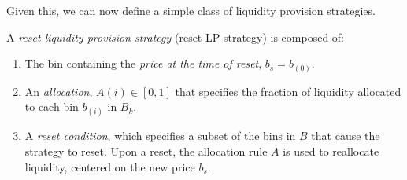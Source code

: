 \documentclass[sigconf, usenames, dvipsnames]{acmart}
\newcommand{\dcp}[1]{\textcolor{blue}{{\scriptsize{David:}}#1}}
\begin{document}



Given this, we can now define a simple class of liquidity provision strategies.
%
\begin{definition}
A \textit{reset liquidity provision strategy} (reset-LP strategy) is composed of: 
\begin{enumerate}
    \item The bin containing the {\em price at the time of reset}, $b_{s}=b_{(0)}$.
    \item An {\em allocation}, $A(i) \in [0,1]$ that specifies the fraction of liquidity allocated to each bin $b_{(i)}$ in $B_k$.
    \item A {\em reset condition}, which specifies a subset of the bins in $B$ that cause the strategy to reset. Upon a reset, the allocation rule $A$ is used to reallocate liquidity, centered on the new price $b_s$.
\end{enumerate}
%
\end{definition}
\end{document}
